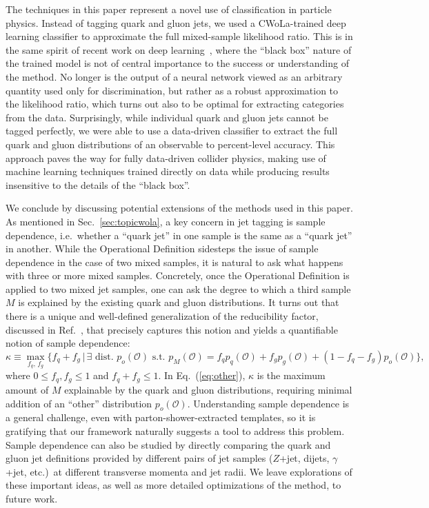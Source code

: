 \documentclass[letterpaper,11pt]{article}
\DeclareRobustCommand{\Sec}[1]{Sec.~\ref{#1}}
\DeclareRobustCommand{\Eq}[1]{Eq.~(\ref{#1})}
\DeclareRobustCommand{\Ref}[1]{Ref.~\cite{#1}}
\renewcommand{\O}{\mathcal{O}}
\begin{document}
The techniques in this paper represent a novel use of classification in particle physics.
%
Instead of tagging quark and gluon jets, we used a CWoLa-trained deep learning classifier to approximate the full mixed-sample likelihood ratio.
%
This is in the same spirit of recent work on deep learning~\cite{Andreassen:2018apy,Komiske:2017ubm,Komiske:2017aww,Chang:2017kvc,Roxlo:2018adx,deOliveira:2017pjk,Paganini:2017hrr,Paganini:2017dwg,DAgnolo:2018cun}, where the ``black box'' nature of the trained model is not of central importance to the success or understanding of the method.
%
No longer is the output of a neural network viewed as an arbitrary quantity used only for discrimination, but rather as a robust approximation to the likelihood ratio, which turns out also to be optimal for extracting categories from the data.
%
Surprisingly, while individual quark and gluon jets cannot be tagged perfectly, we were able to use a data-driven classifier to extract the full quark and gluon distributions of an observable to percent-level accuracy.
%
This approach paves the way for fully data-driven collider physics, making use of machine learning techniques trained directly on data while producing results insensitive to the details of the ``black box''.


We conclude by discussing potential extensions of the methods used in this paper.
%
As mentioned in \Sec{sec:topicwola}, a key concern in jet tagging is sample dependence, i.e.\ whether a ``quark jet'' in one sample is the same as a ``quark jet'' in another.
%
While the Operational Definition sidesteps the issue of sample dependence in the case of two mixed samples, it is natural to ask what happens with three or more mixed samples.
%
Concretely, once the Operational Definition is applied to two mixed jet samples, one can ask the degree to which a third sample $M$ is explained by the existing quark and gluon distributions.
%
It turns out that there is a unique and well-defined generalization of the reducibility factor, discussed in \Ref{katz2017decontamination}, that precisely captures this notion and yields a quantifiable notion of sample dependence:
%
\begin{equation}\label{eq:other}
\kappa \equiv \max_{f_q,\,f_g}\{f_q + f_g \,|\,\exists \text{ dist. } p_o(\O) \text{ s.t. } p_{M}(\O) = f_q p_q(\O) + f_g p_g(\O) + (1-f_q-f_g)p_o(\O)\},
\end{equation}
where $0\le f_q,f_g\le 1$ and $f_q+f_g\le1$.
%
In \Eq{eq:other}, $\kappa$ is the maximum amount of $M$ explainable by the quark and gluon distributions, requiring minimal addition of an ``other'' distribution $p_o(\mathcal O)$.
%
Understanding sample dependence is a general challenge, even with parton-shower-extracted templates, so it is gratifying that our framework naturally suggests a tool to address this problem.
%
Sample dependence can also be studied by directly comparing the quark and gluon jet definitions provided by different pairs of jet samples ($Z$+jet, dijets, $\gamma$+jet, etc.)\ at different transverse momenta and jet radii.
%
We leave explorations of these important ideas, as well as more detailed optimizations of the method, to future work.
\end{document}
